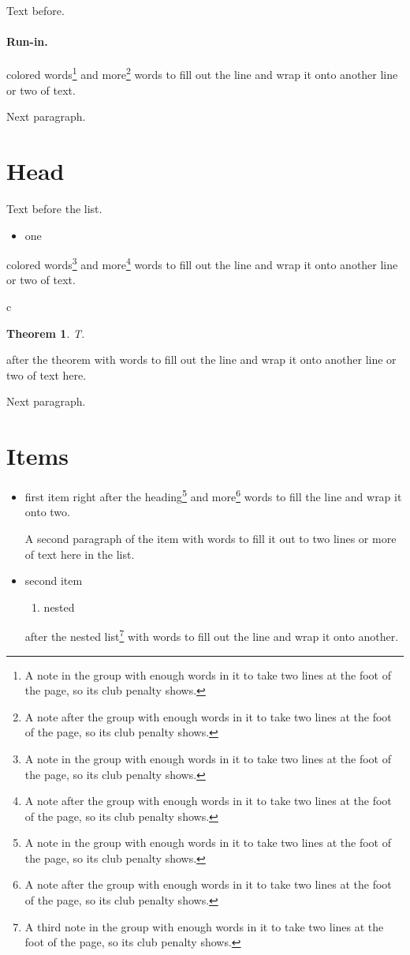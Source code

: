 \documentclass{article}
\newtheorem{theorem}{Theorem}
\begin{document}
Text before.

\paragraph{Run-in.} {\color{red} colored words\footnote{A note in the group with enough words in it to take two lines at the foot of the page, so its club penalty shows.}} and more\footnote{A note after the group with enough words in it to take two lines at the foot of the page, so its club penalty shows.} words to fill out the line and wrap it onto another line or two of text.

Next paragraph.

\section{Head}
Text before the list.
\begin{itemize}
\item one
\end{itemize}
{\color{red} colored words\footnote{A note in the group with enough words in it to take two lines at the foot of the page, so its club penalty shows.}} and more\footnote{A note after the group with enough words in it to take two lines at the foot of the page, so its club penalty shows.} words to fill out the line and wrap it onto another line or two of text.
\begin{center}
c
\end{center}
\begin{theorem} T.
\end{theorem}
{\color{blue} after the theorem} with words to fill out the line and wrap it onto another line or two of text here.

Next paragraph.

\section{Items}
\begin{itemize}
\item {\color{red} first item right after the heading\footnote{A note in the group with enough words in it to take two lines at the foot of the page, so its club penalty shows.}} and more\footnote{A note after the group with enough words in it to take two lines at the foot of the page, so its club penalty shows.} words to fill the line and wrap it onto two.

A second paragraph of the item with words to fill it out to two lines or more of text here in the list.
\item second item
\begin{enumerate}
\item nested
\end{enumerate}
{\color{blue} after the nested list\footnote{A third note in the group with enough words in it to take two lines at the foot of the page, so its club penalty shows.}} with words to fill out the line and wrap it onto another.
\end{itemize}
\end{document}
